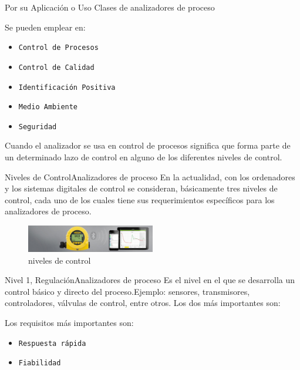 \documentclass[10pt]{beamer}
\begin{document}
{\begin{frame}{Por su Aplicación o Uso }{Clases de analizadores de proceso}
\begin{block}{ }
Se pueden emplear en:
  	\begin{itemize}
    \item {\tt Control de Procesos}
    \item {\tt Control de Calidad}
    \item {\tt Identificación Positiva}
    \item {\tt Medio Ambiente}
    \item {\tt Seguridad}
    \end{itemize}
	\end{block}
 	\vskip 0.5cm
Cuando el analizador se usa en control de procesos significa que forma parte de un determinado lazo de control en alguno de los diferentes niveles de control.
\end{frame}
 \begin{frame}{Niveles de Control}{Analizadores de proceso}
 En la actualidad, con los ordenadores y los sistemas digitales de control se consideran, básicamente tres niveles de control, cada uno de los cuales tiene sus requerimientos específicos para los analizadores de proceso.
 \begin{figure}%
\includegraphics[width=0.5\textwidth]{figura_19.jpg} %
\caption{\label{fig:15}niveles de control} %
\end{figure}
\end{frame}
 
  \begin{frame}{Nivel 1, Regulación}{Analizadores de proceso}
 Es el nivel en el que se desarrolla un control básico y directo del proceso.Ejemplo: sensores, transmisores, controladores, válvulas de control, entre otros.
 Los dos más importantes son:

 \begin{block}{ }
 Los requisitos más importantes son:
  	\begin{itemize}
    \item {\tt Respuesta rápida}
    \item {\tt Fiabilidad}
    \end{itemize}
	\end{block}
    \end{frame}
 
}
\end{document}
